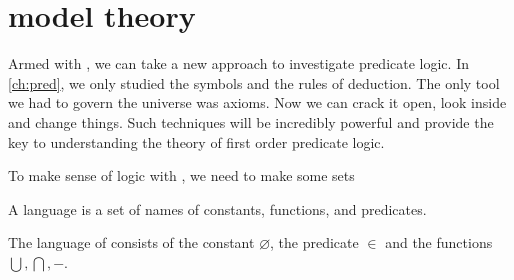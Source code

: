 \message{ !name(truth.tex)}\documentclass{scrbook}
\renewcommand{\emptyset}{\varnothing}
\begin{document}
\chapter[Model theory]{model theory}
Armed with \zfc, we can take a new approach to investigate predicate logic. In \cref{ch:pred}, we only studied the symbols and the rules of deduction. The only tool we had to govern the universe was axioms. Now we can crack it open, look inside and change things. Such techniques will be incredibly powerful and provide the key to understanding the theory of first order predicate logic. 

To make sense of logic with \zfc, we need to make some sets
\begin{defn}[language]
  A language is a set of names of constants, functions, and predicates. 
\end{defn}
\begin{example}
  The language of \zfc consists of the constant $\emptyset$, the predicate $\in$ and the functions $\bigcup,\bigcap,-$. 
\end{example}
\end{document}
